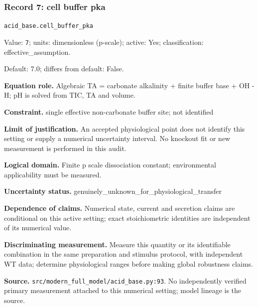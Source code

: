 \subsubsection*{Record 7: cell buffer pka}
{\small \nolinkurl{acid_base.cell_buffer_pka}\par

Value: \texttt{7}; units: dimensionless (p-scale); active: Yes; classification: effective\_assumption.\par

Default: 7.0; differs from default: False.\par

\textbf{Equation role.} Algebraic TA = carbonate alkalinity + finite buffer base + OH - H; pH is solved from TIC, TA and volume.\par

\textbf{Constraint.} single effective non-carbonate buffer site; not identified\par

\textbf{Limit of justification.} An accepted physiological point does not identify this setting or supply a numerical uncertainty interval. No knockout fit or new measurement is performed in this audit.\par

\textbf{Logical domain.} Finite p scale dissociation constant; environmental applicability must be measured.\par

\textbf{Uncertainty status.} genuinely\_unknown\_for\_physiological\_transfer\par

\textbf{Dependence of claims.} Numerical state, current and secretion claims are conditional on this active setting; exact stoichiometric identities are independent of its numerical value.\par

\textbf{Discriminating measurement.} Measure this quantity or its identifiable combination in the same preparation and stimulus protocol, with independent WT data; determine physiological ranges before making global robustness claims.\par

\textbf{Source.} \nolinkurl{src/modern_full_model/acid_base.py:93}. No independently verified primary measurement attached to this numerical setting; model lineage is the source.\par}


